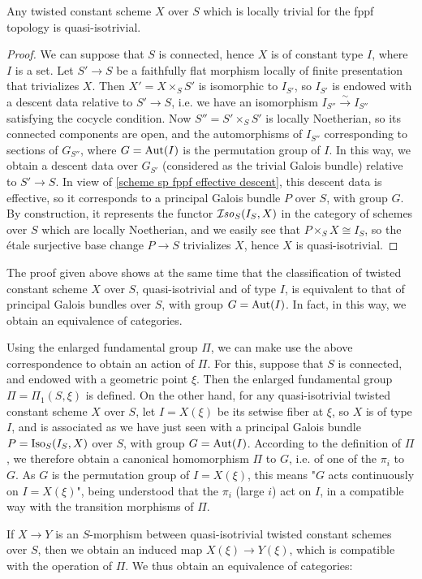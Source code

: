\begin{proposition}\label{scheme twisted constant group fppf trivial is quasi-isotrivial}
Any twisted constant scheme $X$ over $S$ which is locally trivial for the fppf topology is quasi-isotrivial.
\end{proposition}
\begin{proof}
We can suppose that $S$ is connected, hence $X$ is of constant type $I$, where $I$ is a set. Let $S'\to S$ be a faithfully flat morphism locally of finite presentation that trivializes $X$. Then $X'=X\times_SS'$ is isomorphic to $I_{S'}$, so $I_{S'}$ is endowed with a descent data relative to $S'\to S$, i.e. we have an isomorphism $I_{S''}\stackrel{\sim}{\to}I_{S''}$ satisfying the cocycle condition. Now $S''=S'\times_SS'$ is locally Noetherian, so its connected components are open, and the automorphisms of $I_{S''}$ corresponding to sections of $G_{S''}$, where $G=\mathrm{Aut}(I)$ is the permutation group of $I$. In this way, we obtain a descent data over $G_{S'}$ (considered as the trivial Galois bundle) relative to $S'\to S$. In view of \cref{scheme sp fppf effective descent}, this descent data is effective, so it corresponds to a principal Galois bundle $P$ over $S$, with group $G$. By construction, it represents the functor $\operatorname{\mathcal{I}\hspace*{-0.5pt}\textit{so}\hspace{0.5pt}}_S(I_S,X)$ in the category of schemes over $S$ which are locally Noetherian, and we easily see that $P\times_SX\cong I_S$, so the \'etale surjective base change $P\to S$ trivializes $X$, hence $X$ is quasi-isotrivial.
\end{proof}

The proof given above shows at the same time that the classification of twisted constant scheme $X$ over $S$, quasi-isotrivial and of type $I$, is equivalent to that of principal Galois bundles over $S$, with group $G=\mathrm{Aut}(I)$. In fact, in this way, we obtain an equivalence of categories.\par
Using the enlarged fundamental group $\Pi$, we can make use the above correspondence to obtain an action of $\Pi$. For this, suppose that $S$ is connected, and endowed with a geometric point $\xi$. Then the enlarged fundamental group $\Pi=\Pi_1(S,\xi)$ is defined. On the other hand, for any quasi-isotrivial twisted constant scheme $X$ over $S$, let $I=X(\xi)$ be its setwise fiber at $\xi$, so $X$ is of type $I$, and is associated as we have just seen with a principal Galois bundle $P=\mathrm{Iso}_S(I_S,X)$ over $S$, with group $G=\mathrm{Aut}(I)$. According to the definition of $\Pi$, we therefore obtain a canonical homomorphism $\Pi$ to $G$, i.e. of one of the $\pi_i$ to $G$. As $G$ is the permutation group of $I=X(\xi)$, this means "$G$ acts continuously on $I=X(\xi)$", being understood that the $\pi_i$ (large $i$) act on $I$, in a compatible way with the transition morphisms of $\Pi$.\par
If $X\to Y$ is an $S$-morphism between quasi-isotrivial twisted constant schemes over $S$, then we obtain an induced map $X(\xi)\to Y(\xi)$, which is compatible with the operation of $\Pi$. We thus obtain an equivalence of categories:

